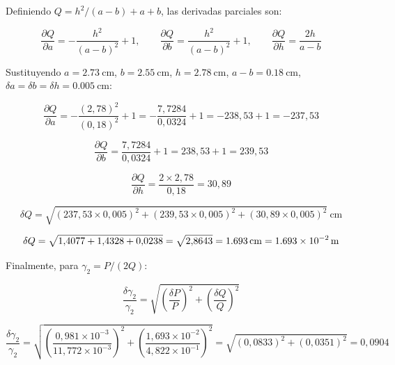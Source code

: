 \begin{appendices}
Definiendo $Q = h^2/(a-b) + a + b$, las derivadas parciales son:

\begin{equation}
    \frac{\partial Q}{\partial a} = -\frac{h^2}{(a-b)^2} + 1, \qquad
    \frac{\partial Q}{\partial b} =  \frac{h^2}{(a-b)^2} + 1, \qquad
    \frac{\partial Q}{\partial h} = \frac{2h}{a-b}
\end{equation}

Sustituyendo $a = \qty{2,73}{\centi\meter}$,
$b = \qty{2,55}{\centi\meter}$,
$h = \qty{2,78}{\centi\meter}$,
$a - b = \qty{0,18}{\centi\meter}$,
$\delta a = \delta b = \delta h = \qty{0,005}{\centi\meter}$:

\begin{equation*}
    \frac{\partial Q}{\partial a}
    = -\frac{(2{,}78)^2}{(0{,}18)^2} + 1
    = -\frac{7{,}7284}{0{,}0324} + 1
    = -238{,}53 + 1
    = -237{,}53
\end{equation*}

\begin{equation*}
    \frac{\partial Q}{\partial b}
    = \frac{7{,}7284}{0{,}0324} + 1
    = 238{,}53 + 1
    = 239{,}53
\end{equation*}

\begin{equation*}
    \frac{\partial Q}{\partial h}
    = \frac{2 \times 2{,}78}{0{,}18}
    = 30{,}89
\end{equation*}

\begin{equation*}
    \delta Q = \sqrt{
        (237{,}53 \times 0{,}005)^2 +
        (239{,}53 \times 0{,}005)^2 +
        (30{,}89  \times 0{,}005)^2
    }\ \si{\centi\meter}
\end{equation*}

\begin{equation*}
    \delta Q = \sqrt{1{,}4077 + 1{,}4328 + 0{,}0238}
             = \sqrt{2{,}8643}
             = \qty{1{,}693}{\centi\meter}
             = \qty{1{,}693e-2}{\meter}
\end{equation*}

Finalmente, para $\gamma_2 = P/(2Q)$:

\begin{equation}
    \frac{\delta\gamma_2}{\gamma_2}
    = \sqrt{
        \left(\frac{\delta P}{P}\right)^2 +
        \left(\frac{\delta Q}{Q}\right)^2
      }
\end{equation}

\begin{equation*}
    \frac{\delta\gamma_2}{\gamma_2}
    = \sqrt{
        \left(\frac{0{,}981\times10^{-3}}{11{,}772\times10^{-3}}\right)^2 +
        \left(\frac{1{,}693\times10^{-2}}{4{,}822\times10^{-1}}\right)^2
      }
    = \sqrt{(0{,}0833)^2 + (0{,}0351)^2}
    = 0{,}0904
\end{equation*}


\end{appendices}
